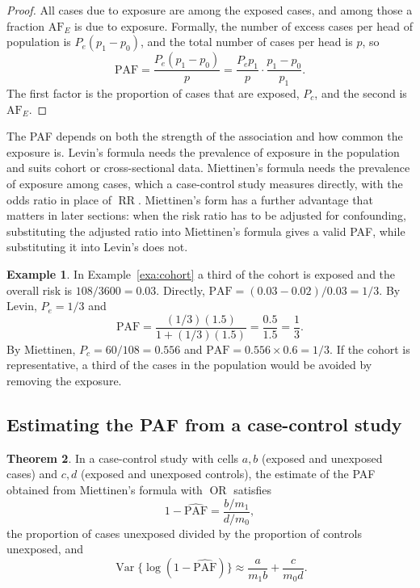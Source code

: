 \documentclass[11pt,a4paper]{article}
\numberwithin{equation}{section}
\DeclareMathOperator{\Var}{Var}
\DeclareMathOperator{\OR}{OR}
\DeclareMathOperator{\RR}{RR}
\theoremstyle{definition}
\newtheorem{thm}{Theorem}[subsection]
\newtheorem{exa}[thm]{Example}
\begin{document}
\begin{proof}
All cases due to exposure are among the exposed cases, and among those a fraction $\text{AF}_E$ is due to exposure. Formally, the number of
excess cases per head of population is $P_e(p_1 - p_0)$, and the total number of cases per head is $p$, so
\[
\text{PAF} = \frac{P_e(p_1 - p_0)}{p} = \frac{P_e p_1}{p} \cdot \frac{p_1 - p_0}{p_1} .
\]
The first factor is the proportion of cases that are exposed, $P_c$, and the second is $\text{AF}_E$.
\end{proof}

The PAF depends on both the strength of the association and how common the exposure is. Levin's formula needs the prevalence of
exposure in the population and suits cohort or cross-sectional data. Miettinen's formula needs the prevalence of exposure among cases, which a case-control study measures directly, with the odds ratio in place of $\RR$. Miettinen's form has a further advantage that matters
in later sections: when the risk ratio has to be adjusted for confounding, substituting the adjusted ratio into Miettinen's formula gives a
valid PAF, while substituting it into Levin's does not.

\begin{exa}
In Example~\ref{exa:cohort} a third of the cohort is exposed and the overall risk is $108/3600 = 0.03$. Directly,
$\text{PAF} = (0.03 - 0.02)/0.03 = 1/3$. By Levin, $P_e = 1/3$ and
\[
\text{PAF} = \frac{(1/3)(1.5)}{1 + (1/3)(1.5)} = \frac{0.5}{1.5} = \frac13 .
\]
By Miettinen, $P_c = 60/108 = 0.556$ and $\text{PAF} = 0.556 \times 0.6 = 1/3$. If the cohort is representative, a third of the cases in the
population would be avoided by removing the exposure.
\end{exa}

\subsection{Estimating the PAF from a case-control study}

\begin{thm}
\label{thm:pafcc}
In a case-control study with cells $a, b$ (exposed and unexposed cases) and $c, d$ (exposed and unexposed controls), the estimate of the
PAF obtained from Miettinen's formula with $\widehat{\OR}$ satisfies
\[
1 - \widehat{\text{PAF}} = \frac{b/m_1}{d/m_0} ,
\]
the proportion of cases unexposed divided by the proportion of controls unexposed, and
\[
\Var\{\log(1 - \widehat{\text{PAF}})\} \approx \frac{a}{m_1 b} + \frac{c}{m_0 d} .
\]
\end{thm}
\end{document}

